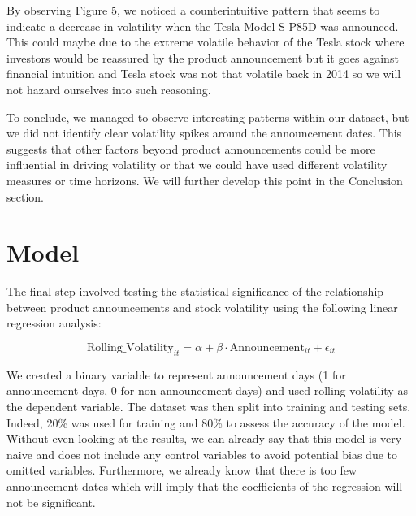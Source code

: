 \documentclass[12pt, oneside]{article}
\begin{document}
By observing Figure 5, we noticed a counterintuitive pattern that seems to indicate a decrease in volatility when the Tesla Model S P85D was announced. This could maybe due to the extreme volatile behavior of the Tesla stock where investors would be reassured by the product announcement but it goes against financial intuition  and Tesla stock was not that volatile back in 2014 so we will not hazard ourselves into such reasoning.

To conclude, we managed to observe interesting patterns within our dataset, but we did not identify clear volatility spikes around the announcement dates. This suggests that other factors beyond product announcements could be more influential in driving volatility or that we could have used different volatility measures or time horizons. We will further develop this point in the Conclusion section.

\section{Model}
The final step involved testing the statistical significance of the relationship between product announcements and stock volatility using the following linear regression analysis:

\[
\text{Rolling\_Volatility}_{it} = \alpha + \beta \cdot \text{Announcement}_{it} + \epsilon_{it}
\]

We created a binary variable to represent announcement days (1 for announcement days, 0 for non-announcement days) and used rolling volatility as the dependent variable. The dataset was then split into training and testing sets. Indeed, 20\% was used for training and 80\% to assess the accuracy of the model. Without even looking at the results, we can already say that this model is very naive and does not include any control variables to avoid potential bias due to omitted variables. Furthermore, we already know that there is too few announcement dates which will imply that the coefficients of the regression will not be significant.
\end{document}
